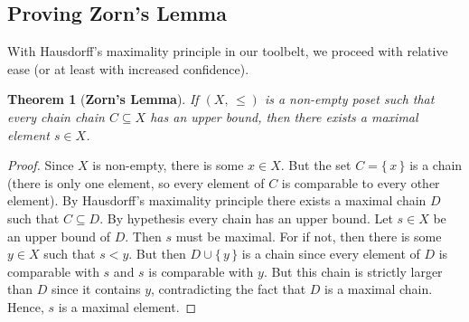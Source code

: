 \documentclass{article}
\newtheorem{theorem}{Theorem}[section]
\theoremstyle{definition}
\begin{document}
        \subsection{Proving Zorn's Lemma}
            With Hausdorff's maximality principle in our toolbelt, we proceed
            with relative ease (or at least with increased confidence).
            \begin{theorem}[\textbf{Zorn's Lemma}]
                If $(X,\,\leq)$ is a non-empty poset such that every chain
                chain $C\subseteq{X}$ has an upper bound, then there exists
                a maximal element $s\in{X}$.
            \end{theorem}
            \begin{proof}
                Since $X$ is non-empty, there is some $x\in{X}$. But the set
                $C=\{\,x\,\}$ is a chain (there is only one element, so every
                element of $C$ is comparable to every other element). By
                Hausdorff's maximality principle there exists a maximal
                chain $D$ such that $C\subseteq{D}$. By
                hypethesis every chain has an upper bound. Let
                $s\in{X}$ be an upper bound of $D$. Then $s$ must be
                maximal. For if not, then there is some $y\in{X}$ such that
                $s<y$. But then $D\cup\{\,y\,\}$ is a chain since
                every element of $D$ is comparable with $s$ and $s$
                is comparable with $y$. But this chain is strictly larger than
                $D$ since it contains $y$, contradicting the fact
                that $D$ is a maximal chain. Hence, $s$ is a
                maximal element.
            \end{proof}
\end{document}
